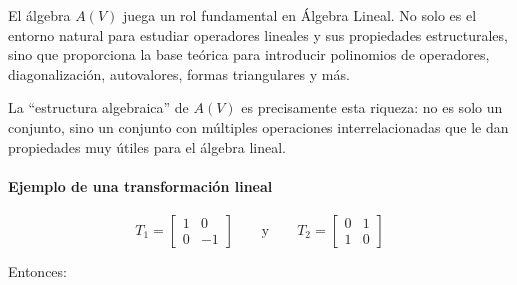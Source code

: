 
\begin{tcolorbox}[remember, title=Observaciones]
El álgebra \(A(V)\) juega un rol fundamental en Álgebra Lineal. No solo es el entorno natural para estudiar operadores lineales y sus propiedades estructurales, sino que proporciona la base teórica para introducir polinomios de operadores, diagonalización, autovalores, formas triangulares y más.
\end{tcolorbox}

La ``estructura algebraica'' de \(A(V)\) es precisamente esta riqueza: no es solo un conjunto, sino un conjunto con múltiples operaciones interrelacionadas que le dan propiedades muy útiles para el álgebra lineal.

\paragraph{Ejemplo de una transformación lineal}


\[
T_1 =
\begin{bmatrix}
1 & 0 \\
0 & -1
\end{bmatrix}
\qquad \text{y} \qquad
T_2 =
\begin{bmatrix}
0 & 1 \\
1 & 0
\end{bmatrix}
\]

Entonces:

